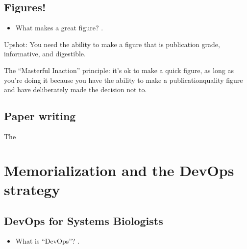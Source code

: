\documentclass[letterpaper,10pt,english]{sphinxmanual}
\begin{document}
\section{Figures!}
\label{\detokenize{02Elements:figures}}\begin{itemize}
\item {} 
\sphinxAtStartPar
What makes a great figure? .

\end{itemize}

\sphinxAtStartPar
Upshot: You need the ability to make a figure that is publication grade, informative, and digestible. 

\sphinxAtStartPar
The “Masterful Inaction” principle: it’s ok to make a quick figure, as long as you’re doing it because you have the ability to make a publication\sphinxhyphen{}quality figure and have deliberately made the decision not to.


\section{Paper writing}
\label{\detokenize{02Elements:paper-writing}}
\sphinxAtStartPar
The {\hyperref[\detokenize{PaperWritingTips:paperwritingtips}]{}}


\chapter{Memorialization and the DevOps strategy}
\label{\detokenize{03DevOps:memorialization-and-the-devops-strategy}}\label{\detokenize{03DevOps::doc}}

\section{DevOps for Systems Biologists}
\label{\detokenize{03DevOps:devops-for-systems-biologists}}\begin{itemize}
\item {} 
\sphinxAtStartPar
What is “DevOps”? .

\end{itemize}
\end{document}
